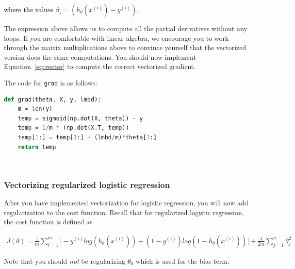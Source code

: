 \documentclass[12pt]{article}
\begin{document}
where the values $\beta_i = (h_\theta(x^{(i)}) - y^{(i)})$.

The expression above allows us to compute all the partial derivatives without any loops. If you are comfortable with linear algebra, we encourage you to work through the matrix multiplications above to convince yourself that the vectorized version does the same computations. You should now implement Equation~\ref{eq:vector} to compute the correct vectorized gradient.

The code for \texttt{grad} is as follows:

\begin{lstlisting}[language=Python]
  def grad(theta, X, y, lmbd):
    m = len(y)
    temp = sigmoid(np.dot(X, theta)) - y
    temp = 1/m * (np.dot(X.T, temp))
    temp[1:] = temp[1:] + (lmbd/m)*theta[1:]
    return temp
\end{lstlisting}

\\


\subsubsection{Vectorizing regularized logistic regression}

After you have implemented vectorization for logistic regression, you will now add regularization to the cost function. Recall that for regularized logistic regression, the cost function is defined as

\begin{align}
  J(\theta) = \frac{1}{m}\sum_{i=1}^m{\big[-y^{(i)}log(h_\theta(x^{(i)}))-(1-y^{(i)})log(1-h_\theta(x^{(i)}))\big]} + \frac{\lambda}{2m}\sum_{j=1}^n{\theta_j^2}
\end{align}

Note that you should \emph{not} be regularizing $\theta_0$ which is used for the bias term.
\end{document}
